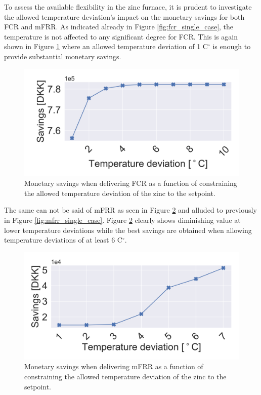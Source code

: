 \documentclass[lettersize,journal]{IEEEtran}
\begin{document}
To assess the available flexibility in the zinc furnace, it is prudent to investigate the allowed temperature deviation's impact on the monetary savings for both FCR and mFRR. As indicated already in Figure \ref{fig:fcr_single_case}, the temperature is not affected to any significant degree for FCR. This is again shown in Figure \ref{fig:profit_vs_delta_temp_fcr} where an allowed temperature deviation of 1 C$^{\circ}$ is enough to provide substantial monetary savings.

\begin{figure}[!t]
    \centering
    \includegraphics[width=\columnwidth]{figures/profit_vs_delta_temp_fcr.png}
    \caption{Monetary savings when delivering FCR as a function of constraining the allowed temperature deviation of the zinc to the setpoint.}
    \label{fig:profit_vs_delta_temp_fcr}
\end{figure}

The same can not be said of mFRR as seen in Figure \ref{fig:profit_vs_delta_temp_mfrr} and alluded to previously in Figure \ref{fig:mfrr_single_case}. Figure \ref{fig:profit_vs_delta_temp_mfrr} clearly shows diminishing value at lower temperature deviations while the best savings are obtained when allowing temperature deviations of at least 6 C$^{\circ}$.

\begin{figure}[!t]
    \centering
    \includegraphics[width=\columnwidth]{figures/profit_vs_delta_temp_mfrr_and_energy.png}
    \caption{Monetary savings when delivering mFRR as a function of constraining the allowed temperature deviation of the zinc to the setpoint.}
    \label{fig:profit_vs_delta_temp_mfrr}
\end{figure}
\end{document}
